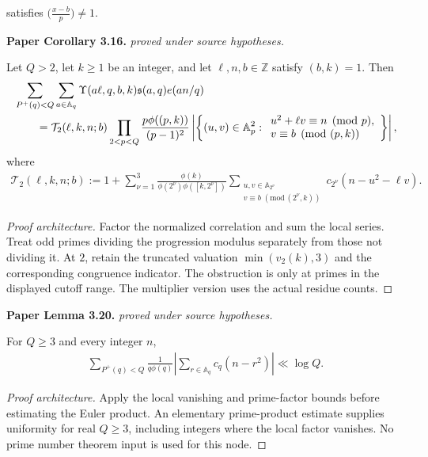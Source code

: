 \begin{lemma}
satisfies $\bigl(\frac{x-b}{p}\bigr)\ne1$.
\par\medskip\noindent\textbf{Paper Corollary 3.16.} \textit{proved under source hypotheses.}\par
Let $Q>2$, let $k\geq1$ be an integer, and let $\ell,n,b\in\mathbb Z$ satisfy $(b,k)=1$. Then
\begin{align}
 &\sum_{P^+(q)<Q}\sum_{a\in\mathbb A_q}
 \Upsilon(a\ell,q,b,k)\mathfrak s(a,q)e(an/q)\notag\\
 &\qquad=
 \mathcal T_2(\ell,k,n;b)
 \prod_{2<p<Q}
 \frac{p\phi((p,k))}{(p-1)^2}
 \left|\left\{(u,v)\in\mathbb A_p^2:
 \begin{array}{l}
  u^2+\ell v\equiv n\pmod p,\\
  v\equiv b\pmod{(p,k)}
 \end{array}\right\}\right|,
\end{align}
where 
\begin{align}
 \mathcal T_2(\ell,k,n;b)
 :=
 1+\sum_{\nu=1}^{3}
 \frac{\phi(k)}
 {\phi(2^\nu)\phi([k,2^\nu])}
 \sum_{\substack{u,v\in\mathbb A_{2^\nu}\\
 v\equiv b\;(\mathrm{mod}\,(2^\nu,k))}}
 c_{2^\nu}(n-u^2-\ell v).
\end{align}
\end{lemma}
\begin{proof}[Proof architecture]
\leanok
Factor the normalized correlation and sum the local series. Treat odd primes dividing the progression modulus separately from those not dividing it. At $2$, retain the truncated valuation $\min(v_2(k),3)$ and the corresponding congruence indicator. The obstruction is only at primes in the displayed cutoff range. The multiplier version uses the actual residue counts.
\end{proof}

\begin{lemma}
\label{cohen_log_bound}
\leanok
\par\medskip\noindent\textbf{Paper Lemma 3.20.} \textit{proved under source hypotheses.}\par
For $Q\geq3$ and every integer $n$,
\begin{align}
 \sum_{P^+(q)<Q}\frac1{q\phi(q)}
 \left|\sum_{r\in\mathbb A_q}c_q(n-r^2)\right|
 \ll\log Q.
\end{align}
\end{lemma}
\begin{proof}[Proof architecture]
\leanok
Apply the local vanishing and prime-factor bounds before estimating the Euler product. An elementary prime-product estimate supplies uniformity for real $Q\geq3$, including integers where the local factor vanishes. No prime number theorem input is used for this node.
\end{proof}


